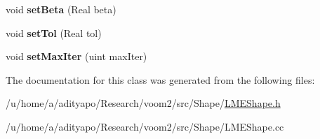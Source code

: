 \begin{DoxyCompactItemize}
\item 
\hypertarget{classvoom_1_1_l_m_e_shape_a9cc76717eaf84d2bbd1a738ef675a768}{
void {\bfseries setBeta} (Real beta)}
\label{classvoom_1_1_l_m_e_shape_a9cc76717eaf84d2bbd1a738ef675a768}

\item 
\hypertarget{classvoom_1_1_l_m_e_shape_a57640a3f7493096c0afdfaab0e5279e1}{
void {\bfseries setTol} (Real tol)}
\label{classvoom_1_1_l_m_e_shape_a57640a3f7493096c0afdfaab0e5279e1}

\item 
\hypertarget{classvoom_1_1_l_m_e_shape_ac710c43a96fb4e9cb77c308d87bf0ce0}{
void {\bfseries setMaxIter} (uint maxIter)}
\label{classvoom_1_1_l_m_e_shape_ac710c43a96fb4e9cb77c308d87bf0ce0}

\end{DoxyCompactItemize}


The documentation for this class was generated from the following files:\begin{DoxyCompactItemize}
\item 
/u/home/a/adityapo/Research/voom2/src/Shape/\hyperlink{_l_m_e_shape_8h}{LMEShape.h}\item 
/u/home/a/adityapo/Research/voom2/src/Shape/LMEShape.cc\end{DoxyCompactItemize}
